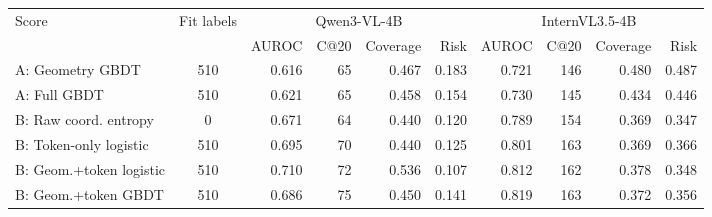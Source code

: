 \begin{tabular*}{\textwidth}{@{\extracolsep{\fill}}lcrrrrrrrr@{}}
\toprule
Score & Fit labels & \multicolumn{4}{c}{Qwen3-VL-4B} & \multicolumn{4}{c}{InternVL3.5-4B} \\
\cmidrule(lr){3-6}\cmidrule(lr){7-10}
 & & AUROC & C@20 & Coverage & Risk & AUROC & C@20 & Coverage & Risk \\
\midrule
A: Geometry GBDT & 510 & 0.616 & 65 & 0.467 & 0.183 & 0.721 & 146 & 0.480 & 0.487 \\
A: Full GBDT & 510 & 0.621 & 65 & 0.458 & 0.154 & 0.730 & 145 & 0.434 & 0.446 \\
B: Raw coord. entropy & 0 & 0.671 & 64 & 0.440 & 0.120 & 0.789 & 154 & 0.369 & 0.347 \\
B: Token-only logistic & 510 & 0.695 & 70 & 0.440 & 0.125 & 0.801 & 163 & 0.369 & 0.366 \\
B: Geom.+token logistic & 510 & 0.710 & 72 & 0.536 & 0.107 & 0.812 & 162 & 0.378 & 0.348 \\
B: Geom.+token GBDT & 510 & 0.686 & 75 & 0.450 & 0.141 & 0.819 & 163 & 0.372 & 0.356 \\
\bottomrule
\end{tabular*}
